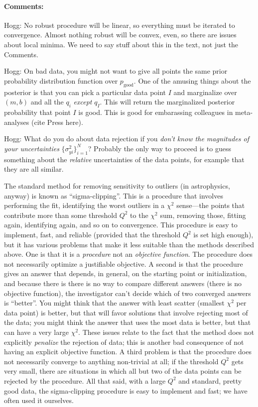 \documentclass[12pt]{article}
\newcommand{\commentsname}{Comments}
\newcounter{problem}
\newenvironment{comments}{\paragraph{\commentsname:}}{}
\newcommand{\setofall}[3]{\{{#1}\}_{{#2}}^{{#3}}}
\newcommand{\allsigmay}{\setofall{\sigma_{yi}^2}{i=1}{N}}
\newcommand{\pgood}{p_{\mathrm{good}}}
\begin{document}
\begin{comments}
Hogg: No robust procedure will be linear, so everything must be
iterated to convergence.  Almost nothing robust will be convex, even,
so there are issues about local minima.  We need to say stuff about
this in the text, not just the \commentsname.

Hogg: On bad data, you might not want to give all points the same
prior probability distribution function over $\pgood$.  One of the
amusing things about the posterior is that you can pick a particular
data point $I$ and marginalize over $(m,b)$ and all the $q_i$
\emph{except} $q_I$.  This will return the marginalized posterior
probability that point $I$ is good.  This is good for embarassing
colleagues in meta-analyses (cite Press here).

Hogg: What do you do about data rejection if you \emph{don't know the
  magnitudes of your uncertainties} $\allsigmay$?  Probably the only
way to proceed is to guess something about the \emph{relative}
uncertainties of the data points, for example that they are all
similar.

The standard method for removing sensitivity to outliers (in
astrophysics, anyway) is known as ``sigma-clipping''.  This is a
procedure that involves performing the fit, identifying the worst
outliers in a $\chi^2$ sense---the points that contribute more than
some threshold $Q^2$ to the $\chi^2$ sum, removing those, fitting
again, identifying again, and so on to convergence.  This procedure is
easy to implement, fast, and reliable (provided that the threshold
$Q^2$ is set high enough), but it has various problems that make it
less suitable than the methods described above.  One is that it is a
\emph{procedure} not an \emph{objective function}.  The procedure does
not necessarily optimize a justifiable objective.  A second is that
the procedure gives an answer that depends, in general, on the
starting point or initialization, and because there is there is no way
to compare different answers (there is no objective function), the
investigator can't decide which of two converged answers is
``better''.  You might think that the answer with least scatter
(smallest $\chi^2$ per data point) is better, but that will favor
solutions that involve rejecting most of the data; you might think the
answer that uses the most data is better, but that can have a very
large $\chi^2$.  These issues relate to the fact that the method does
not explicitly \emph{penalize} the rejection of data; this is another
bad consequence of not having an explicit objective function.  A third
problem is that the procedure does not necessarily converge to
anything non-trivial at all; if the threshold $Q^2$ gets very small,
there are situations in which all but two of the data points can be
rejected by the procedure.  All that said, with a large $Q^2$ and
standard, pretty good data, the sigma-clipping procedure is easy to
implement and fast; we have often used it ourselves.
\end{comments}
\end{document}
